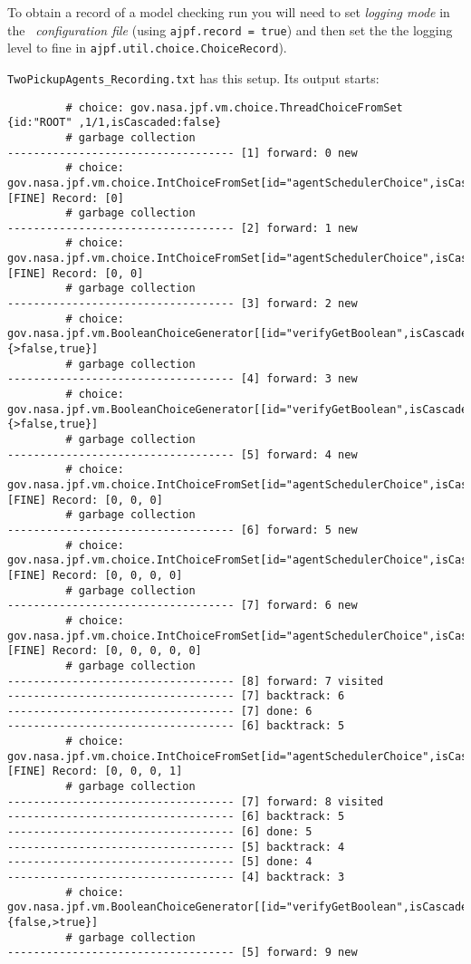 \documentclass[a4]{article}
\begin{document}
To obtain a record of a model checking run you will need to set \emph{logging mode} in the \emph{\ail\ configuration file} (using \texttt{ajpf.record = true}) and then set the the logging level to fine in \texttt{ajpf.util.choice.ChoiceRecord}).

\texttt{TwoPickupAgents\_Recording.txt} has this setup.  Its output starts:
\begin{verbatim}
		 # choice: gov.nasa.jpf.vm.choice.ThreadChoiceFromSet {id:"ROOT" ,1/1,isCascaded:false}
		 # garbage collection
----------------------------------- [1] forward: 0 new
		 # choice: gov.nasa.jpf.vm.choice.IntChoiceFromSet[id="agentSchedulerChoice",isCascaded:false,>0,1]
[FINE] Record: [0]
		 # garbage collection
----------------------------------- [2] forward: 1 new
		 # choice: gov.nasa.jpf.vm.choice.IntChoiceFromSet[id="agentSchedulerChoice",isCascaded:false,>0,1]
[FINE] Record: [0, 0]
		 # garbage collection
----------------------------------- [3] forward: 2 new
		 # choice: gov.nasa.jpf.vm.BooleanChoiceGenerator[[id="verifyGetBoolean",isCascaded:false,{>false,true}]
		 # garbage collection
----------------------------------- [4] forward: 3 new
		 # choice: gov.nasa.jpf.vm.BooleanChoiceGenerator[[id="verifyGetBoolean",isCascaded:false,{>false,true}]
		 # garbage collection
----------------------------------- [5] forward: 4 new
		 # choice: gov.nasa.jpf.vm.choice.IntChoiceFromSet[id="agentSchedulerChoice",isCascaded:false,>0]
[FINE] Record: [0, 0, 0]
		 # garbage collection
----------------------------------- [6] forward: 5 new
		 # choice: gov.nasa.jpf.vm.choice.IntChoiceFromSet[id="agentSchedulerChoice",isCascaded:false,>0,1]
[FINE] Record: [0, 0, 0, 0]
		 # garbage collection
----------------------------------- [7] forward: 6 new
		 # choice: gov.nasa.jpf.vm.choice.IntChoiceFromSet[id="agentSchedulerChoice",isCascaded:false,>0]
[FINE] Record: [0, 0, 0, 0, 0]
		 # garbage collection
----------------------------------- [8] forward: 7 visited
----------------------------------- [7] backtrack: 6
----------------------------------- [7] done: 6
----------------------------------- [6] backtrack: 5
		 # choice: gov.nasa.jpf.vm.choice.IntChoiceFromSet[id="agentSchedulerChoice",isCascaded:false,0,>1]
[FINE] Record: [0, 0, 0, 1]
		 # garbage collection
----------------------------------- [7] forward: 8 visited
----------------------------------- [6] backtrack: 5
----------------------------------- [6] done: 5
----------------------------------- [5] backtrack: 4
----------------------------------- [5] done: 4
----------------------------------- [4] backtrack: 3
		 # choice: gov.nasa.jpf.vm.BooleanChoiceGenerator[[id="verifyGetBoolean",isCascaded:false,{false,>true}]
		 # garbage collection
----------------------------------- [5] forward: 9 new
\end{verbatim}
\end{document}
